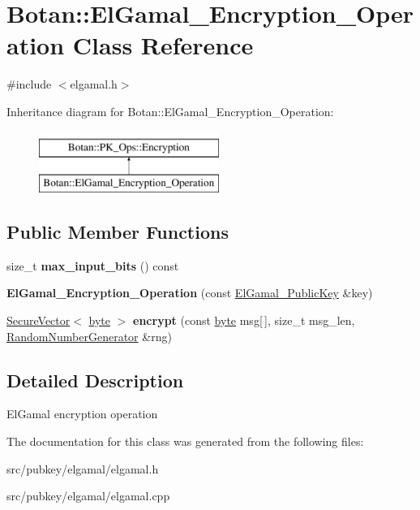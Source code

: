 \hypertarget{classBotan_1_1ElGamal__Encryption__Operation}{\section{Botan\-:\-:El\-Gamal\-\_\-\-Encryption\-\_\-\-Operation Class Reference}
\label{classBotan_1_1ElGamal__Encryption__Operation}
}


{\ttfamily \#include $<$elgamal.\-h$>$}

Inheritance diagram for Botan\-:\-:El\-Gamal\-\_\-\-Encryption\-\_\-\-Operation\-:\begin{figure}[H]
\begin{center}
\leavevmode
\includegraphics[height=2.000000cm]{classBotan_1_1ElGamal__Encryption__Operation}
\end{center}
\end{figure}
\subsection*{Public Member Functions}
\begin{DoxyCompactItemize}
\item 
\hypertarget{classBotan_1_1ElGamal__Encryption__Operation_a76b3c1d1dfd0c2c40ad326cdf5e26891}{size\-\_\-t {\bfseries max\-\_\-input\-\_\-bits} () const }\label{classBotan_1_1ElGamal__Encryption__Operation_a76b3c1d1dfd0c2c40ad326cdf5e26891}

\item 
\hypertarget{classBotan_1_1ElGamal__Encryption__Operation_af5ee20debef80c5cae4c109f30b8cd34}{{\bfseries El\-Gamal\-\_\-\-Encryption\-\_\-\-Operation} (const \hyperlink{classBotan_1_1ElGamal__PublicKey}{El\-Gamal\-\_\-\-Public\-Key} \&key)}\label{classBotan_1_1ElGamal__Encryption__Operation_af5ee20debef80c5cae4c109f30b8cd34}

\item 
\hypertarget{classBotan_1_1ElGamal__Encryption__Operation_af0599e0aabc0aeacaf33b4e6d4bb1425}{\hyperlink{classBotan_1_1SecureVector}{Secure\-Vector}$<$ \hyperlink{namespaceBotan_a7d793989d801281df48c6b19616b8b84}{byte} $>$ {\bfseries encrypt} (const \hyperlink{namespaceBotan_a7d793989d801281df48c6b19616b8b84}{byte} msg\mbox{[}$\,$\mbox{]}, size\-\_\-t msg\-\_\-len, \hyperlink{classBotan_1_1RandomNumberGenerator}{Random\-Number\-Generator} \&rng)}\label{classBotan_1_1ElGamal__Encryption__Operation_af0599e0aabc0aeacaf33b4e6d4bb1425}

\end{DoxyCompactItemize}


\subsection{Detailed Description}
El\-Gamal encryption operation 

The documentation for this class was generated from the following files\-:\begin{DoxyCompactItemize}
\item 
src/pubkey/elgamal/elgamal.\-h\item 
src/pubkey/elgamal/elgamal.\-cpp\end{DoxyCompactItemize}
